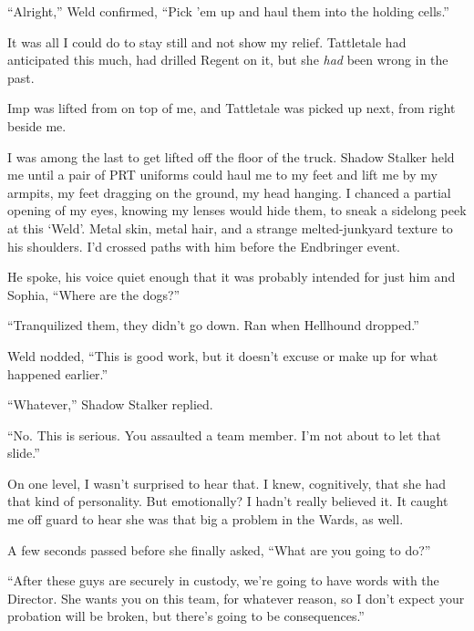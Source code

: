 ``Alright,'' Weld confirmed, ``Pick 'em up and haul them into the holding cells.''



It was all I could do to stay still and not show my relief.  Tattletale had anticipated this much, had drilled Regent on it, but she \emph{had} been wrong in the past.



Imp was lifted from on top of me, and Tattletale was picked up next, from right beside me.



I was among the last to get lifted off the floor of the truck.  Shadow Stalker held me until a pair of PRT uniforms could haul me to my feet and lift me by my armpits, my feet dragging on the ground, my head hanging.  I chanced a partial opening of my eyes, knowing my lenses would hide them, to sneak a sidelong peek at this `Weld'.  Metal skin, metal hair, and a strange melted-junkyard texture to his shoulders.  I'd crossed paths with him before the Endbringer event.



He spoke, his voice quiet enough that it was probably intended for just him and Sophia, ``Where are the dogs?''



``Tranquilized them, they didn't go down.  Ran when Hellhound dropped.''



Weld nodded, ``This is good work, but it doesn't excuse or make up for what happened earlier.''



``Whatever,'' Shadow Stalker replied.



``No.  This is serious.  You assaulted a team member.  I'm not about to let that slide.''



On one level, I wasn't surprised to hear that.  I knew, cognitively, that she had that kind of personality.   But emotionally?  I hadn't really believed it.  It caught me off guard to hear she was that big a problem in the Wards, as well.



A few seconds passed before she finally asked, ``What are you going to do?''



``After these guys are securely in custody, we're going to have words with the Director.  She wants you on this team, for whatever reason, so I don't expect your probation will be broken, but there's going to be consequences.''



